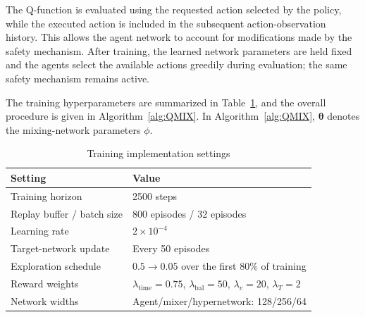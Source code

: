 \documentclass[10pt,journal,letterpaper]{IEEEtran}
\newcommand{\newrev}[1]{#1}
\begin{document}
The Q-function is evaluated using the requested action selected by the policy, while the executed action is included in the subsequent action-observation history. This allows the agent network to account for modifications made by the safety mechanism. \newrev{After training, the learned network parameters are held fixed and the agents select the available actions greedily during evaluation; the same safety mechanism remains active.}

The training hyperparameters are summarized in Table~\ref{tab:training_settings}, and the overall procedure is given in Algorithm~\ref{alg:QMIX}. In Algorithm~\ref{alg:QMIX}, $\bm{\theta}$ denotes the mixing-network parameters $\phi$.

\begin{table}[!t]
\centering
\caption{Training implementation settings}
\label{tab:training_settings}
\scriptsize
\setlength{\tabcolsep}{3pt}
\renewcommand{\arraystretch}{1.03}
\begin{tabular}{@{}p{}p{}@{}}
\toprule
\textbf{Setting} & \textbf{Value} \\
\midrule
Training horizon & 2500 steps \\
Replay buffer / batch size & 800 episodes / 32 episodes \\
Learning rate & $2\times10^{-4}$ \\
Target-network update & Every 50 episodes \\
Exploration schedule & $0.5\rightarrow0.05$ over the first 80\% of training \\
Reward weights & $\lambda_{\mathrm{time}}=0.75$, $\lambda_{\mathrm{bal}}=50$, $\lambda_v=20$, $\lambda_T=2$ \\
Network widths & Agent/mixer/hypernetwork: 128/256/64 \\
\bottomrule
\end{tabular}
\end{table}
\end{document}
